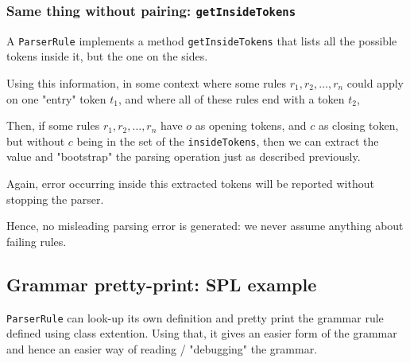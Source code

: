 \documentclass{article}
\newcommand\cc[1]{\lstinline{#1}}
\begin{document}
			\subsubsection{Same thing without pairing: \cc{getInsideTokens}}
			A \cc{ParserRule} implements a method \cc{getInsideTokens} that lists all the possible tokens inside it, but the one on the sides.

			Using this information, in some context where some rules $r_1, r_2, \dots, r_n$ could apply on one "entry" token $t_1$, and where all of these rules end with a token $t_2$, 

			Then, if some rules $r_1, r_2, \dots, r_n$ have $o$ as opening tokens, and $c$ as closing token, but without $c$ being in the set of the \cc{insideTokens}, then we can extract the value and "bootstrap" the parsing operation just as described previously.

			Again, error occurring inside this extracted tokens will be reported without stopping the parser.

			Hence, no misleading parsing error is generated: we never assume anything about failing rules. 
		\subsection{Grammar pretty-print: SPL example}
			\cc{ParserRule} can look-up its own definition and pretty print the grammar rule defined using class extention. Using that, it gives an easier form of the grammar and hence an easier way of reading / "debugging" the grammar.
\end{document}
